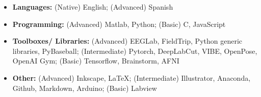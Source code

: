 \begin{adjustwidth}{-.75em}{0pt}
    \begin{itemize}
    \item[] \textbf{Languages:} (Native) English; (Advanced) Spanish\\
    \item[] \textbf{Programming: }(Advanced) Matlab, Python; (Basic) C, JavaScript
    \item[] \textbf{Toolboxes/ Libraries:} (Advanced) EEGLab, FieldTrip, Python generic 
    libraries, PyBaseball; (Intermediate) Pytorch, DeepLabCut, VIBE, OpenPose, OpenAI Gym; (Basic) Tensorflow, Brainstorm, AFNI
    \item[] \textbf{Other:} (Advanced) Inkscape, LaTeX; (Intermediate) Illustrator, Anaconda, Github, Markdown, Arduino; (Basic) Labview
    \end{itemize}
\end{adjustwidth}